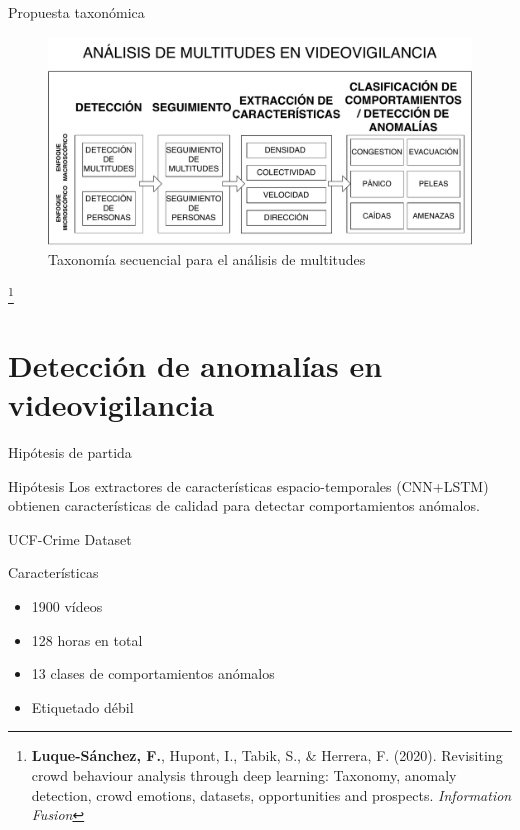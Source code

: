 \documentclass[10pt]{beamer}
\newcommand\blfootnote[1]{%
  \begingroup
  \renewcommand\thefootnote{}\footnote{#1}%
  \addtocounter{footnote}{-1}%
  \endgroup
}
\begin{document}
\begin{frame}{Propuesta taxonómica}
  \begin{figure}
    \centering
    \includegraphics[width=.7\textwidth]{images/taxonomy-steps.pdf}
    \caption{Taxonomía secuencial para el análisis de multitudes}
  \end{figure}

  \blfootnote{\textbf{Luque-Sánchez, F.}, Hupont, I., Tabik, S., \& Herrera,
    F. (2020). Revisiting crowd behaviour analysis through deep
    learning: Taxonomy, anomaly detection, crowd emotions, datasets,
    opportunities and prospects. \textit{Information Fusion}}
\end{frame}

\section{Detección de anomalías en videovigilancia}

\begin{frame}{Hipótesis de partida}
  \begin{block}{Hipótesis}
    Los extractores de características espacio-temporales (CNN+LSTM)
    obtienen características de calidad para detectar comportamientos
    anómalos.
  \end{block}
\end{frame}

\begin{frame}{UCF-Crime Dataset}
  \begin{block}{Características}
    \begin{itemize}
    \item 1900 vídeos
    \item 128 horas en total
    \item 13 clases de comportamientos anómalos
    \item Etiquetado débil
    \end{itemize}
  \end{block}
\end{frame}
\end{document}
